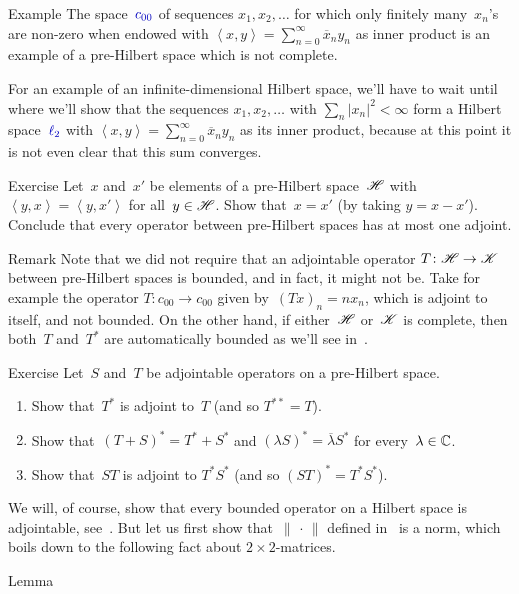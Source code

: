 \documentclass[a]{subfiles}
\begin{document}
\begin{parsec}[hilb]
\begin{point}{Example}
The space~$\Define{c_{00}}$
of sequences $x_1,x_2,\dotsc$
for which only finitely many~$x_n$'s are non-zero
when  endowed with $\left<x,y\right>=\sum_{n=0}^\infty \overline{x}_ny_n$
as inner product
is an example of a 
pre-Hilbert space which is not complete.

For an example
of an infinite-dimensional Hilbert
space,
we'll have to wait until~
where 
we'll show
that the sequences $x_1,x_2,\dotsc$
with $\sum_n \left|x_n\right|^2<\infty$
form a Hilbert space~$\Define{\ell_2}$
with $\left<x,y\right>=\sum_{n=0}^\infty \overline{x}_ny_n$
as its inner product,
because at this point it is not
even clear that this sum converges.
\end{point}
\begin{point}{Exercise}%
Let~$x$ and~$x'$ be elements of a pre-Hilbert space~$\mathscr{H}$
with $\left<y,x\right>=\left<y,x'\right>$
for all~$y\in\mathscr{H}$.
Show that~$x=x'$ (by taking $y=x-x'$).
Conclude that every operator between pre-Hilbert spaces
has at most one adjoint.
\begin{point}{Remark}%
Note that we did not require that
an adjointable operator $T\colon \mathscr{H}\to\mathscr{K}$
between pre-Hilbert spaces is bounded,
and in fact, it might not be.
Take for example
the operator
$T\colon c_{00}\to c_{00}$
given by~$(T x)_n = nx_n$,
which is adjoint to itself,
and not bounded.
On the other hand,
if either~$\mathscr{H}$ or~$\mathscr{K}$ is complete,
then both~$T$ and~$T^*$ are automatically bounded
as we'll see in~.
\end{point}
\end{point}
\begin{point}{Exercise}%
Let~$S$ and~$T$ be adjointable operators on a pre-Hilbert space.
\begin{enumerate}
\item
Show that~$T^*$ is adjoint to~$T$ (and so $T^{**}=T$).
\item
Show that~$(T+S)^*=T^*+S^*$
and $(\lambda S)^*=\overline{\lambda}S^*$
for every~$\lambda\in \mathbb{C}$.
\item
Show that~$ST$ is adjoint to $T^*S^*$ (and so $(ST)^*=T^*S^*$).
\end{enumerate}
We will, of course, show
that every bounded operator on a Hilbert space is adjointable,
see~.
But let us first show that~$\|\,\cdot\,\|$
defined in~ is a norm,
which boils down to the following fact
about  $2\times 2$-matrices.
\end{point}
\begin{point}{Lemma}%

\end{point}
\end{parsec}
\end{document}
